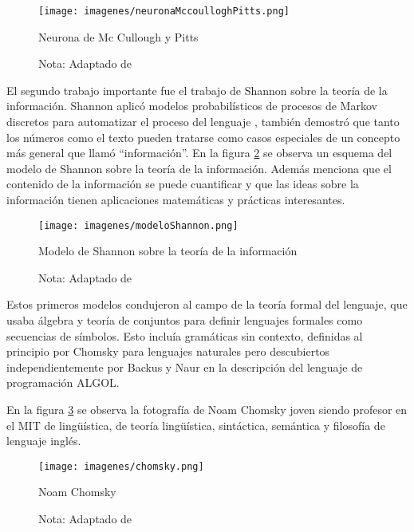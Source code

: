 \documentclass[12pt]{article}
\begin{document}
			\begin{figure}[H]
				\texttt{[image: imagenes/neuronaMccoulloghPitts.png]}
				\centering
				\caption{Neurona de Mc Cullough y Pitts }
				\caption*{\small Nota: Adaptado de \cite{Manevitz2007}}
				\label{fig:neuronaMcCulloghPitts}
			\end{figure}		
			
			
			El segundo trabajo importante fue el trabajo de Shannon sobre la teoría de la información. Shannon aplicó modelos probabilísticos de procesos de Markov discretos para automatizar el proceso del lenguaje \cite{Kumar2011}, también demostró que tanto los números como el texto pueden tratarse como casos especiales de un concepto más general que llamó ``información''. En la figura \ref{fig:modeloShannon} se observa un esquema del modelo de Shannon sobre la teoría de la información. Además menciona que el contenido de la información se puede cuantificar y que las ideas sobre la información tienen aplicaciones matemáticas y prácticas interesantes.\cite{Lehnert2014}
				
			
			
			\begin{figure}[H]
				\texttt{[image: imagenes/modeloShannon.png]}
				\centering
				\caption{Modelo de Shannon sobre la teoría de la información}
				\caption*{\small Nota: Adaptado de  \cite{Nizami2015}}
				\label{fig:modeloShannon}
			\end{figure}
			
			
			Estos primeros modelos condujeron al campo de la teoría formal del lenguaje, que usaba álgebra y teoría de conjuntos para definir lenguajes formales como secuencias de símbolos. Esto incluía gramáticas sin contexto, definidas al principio por Chomsky para lenguajes naturales pero descubiertos independientemente por Backus y Naur en la descripción del lenguaje de programación ALGOL.\cite{Kumar2011}
			
			En la figura \ref{fig:chomsky} se observa la fotografía de Noam Chomsky joven siendo profesor en el MIT de lingüística, de teoría lingüística, sintáctica, semántica y filosofía de lenguaje inglés.			
			
			\begin{figure}[h]
				\texttt{[image: imagenes/chomsky.png]}
				\centering
				\caption{Noam Chomsky}
				\caption*{\small Nota: Adaptado de  \cite{UMBC2004}}
				\label{fig:chomsky}
			\end{figure}		
			
\end{document}
